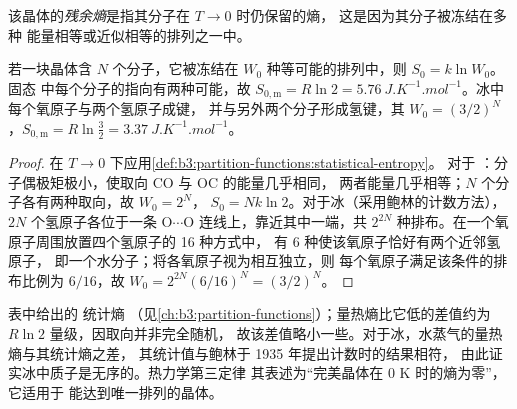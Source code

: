 \begin{definition}[残余熵]\label{def:b3:statistical-thermo-applied:residual-entropy}
该晶体的\emph{残余熵}是指其分子在 $T \to 0$ 时仍保留的熵，
这是因为其分子被冻结在多种
能量相等或近似相等的排列之一中。
\end{definition}

\begin{proposition}[一氧化碳和冰的残余熵]\label{prop:b3:statistical-thermo-applied:residual}
若一块晶体含 $N$ 个分子，它被冻结在 $W_0$ 种等可能的排列中，则 $S_0 =
k\ln W_0$。固态  中每个分子的指向有两种可能，故 $S_{0,\mathrm m} = R\ln2 =
\qty{5.76}{J.K^{-1}.mol^{-1}}$。冰中每个氧原子与两个氢原子成键，
并与另外两个分子形成氢键，其 $W_0 = (3/2)^N$，$S_{0,\mathrm m} = R\ln\frac32 =
\qty{3.37}{J.K^{-1}.mol^{-1}}$。
\end{proposition}

\begin{proof}
在 $T \to 0$ 下应用\cref{def:b3:partition-functions:statistical-entropy}。
对于 ：分子偶极矩极小，使取向 CO 与 OC 的能量几乎相同，
两者能量几乎相等；$N$ 个分子各有两种取向，故 $W_0 = 2^N$，
$S_0 = Nk\ln2$。对于冰（采用鲍林的计数方法），$2N$ 个氢原子各位于一条
O$\cdots$O 连线上，靠近其中一端，共 $2^{2N}$ 种排布。在一个氧原子周围放置四个氢原子的 16 种方式中，
有 6 种使该氧原子恰好有两个近邻氢原子，
即一个水分子；将各氧原子视为相互独立，则
每个氧原子满足该条件的排布比例为 $6/16$，故 $W_0 = 2^{2N}(6/16)^N = (3/2)^N$。
\end{proof}

表中给出的  统计熵
（见\cref{ch:b3:partition-functions}）；量热熵比它低的差值约为
$R\ln2$ 量级，因取向并非完全随机，
故该差值略小一些。对于冰，水蒸气的量热熵与其统计熵之差，
其统计值与鲍林于 1935 年提出计数时的结果相符，
由此证实冰中质子是无序的。热力学第三定律
其表述为“完美晶体在 0 K 时的熵为零”，它适用于
能达到唯一排列的晶体。

